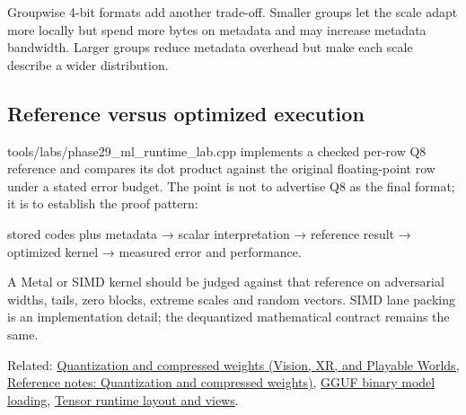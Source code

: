 Groupwise 4-bit formats add another trade-off. Smaller groups let the scale adapt more locally but spend more bytes on metadata and may increase metadata bandwidth. Larger groups reduce metadata overhead but make each scale describe a wider distribution.

\subsection{Reference versus optimized execution}\label{appendix-241c0e42ac2d-reference-versus-optimized-execution}

\hypertarget{appendix-241c0e42ac2d-reference-versus-optimized-execution}{}

tools/labs/phase29\_ml\_runtime\_lab.cpp implements a checked per-row Q8 reference and compares its dot product against the original floating-point row under a stated error budget. The point is not to advertise Q8 as the final format; it is to establish the proof pattern:

stored codes plus metadata → scalar interpretation → reference result → optimized kernel → measured error and performance.

A Metal or SIMD kernel should be judged against that reference on adversarial widths, tails, zero blocks, extreme scales and random vectors. SIMD lane packing is an implementation detail; the dequantized mathematical contract remains the same.

Related: \href{../07-Vision-XR-and-Playable-Worlds/main.pdf\#nameddest=appendix-fdc7879e8bf2}{Quantization and compressed weights (Vision, XR, and Playable Worlds, Reference notes: Quantization and compressed weights)}, \hyperref[appendix-fef72dd246f2]{GGUF binary model loading}, \hyperref[appendix-cebadf3106d1]{Tensor runtime layout and views}.
